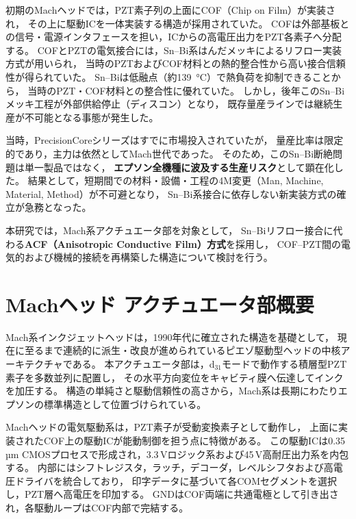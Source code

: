 \documentclass[conference]{IEEEtran}
\begin{document}
初期のMachヘッドでは，PZT素子列の上面にCOF（Chip on Film）が実装され，
その上に駆動ICを一体実装する構造が採用されていた。  
COFは外部基板との信号・電源インタフェースを担い，ICからの高電圧出力をPZT各素子へ分配する。  
COFとPZTの電気接合には，Sn–Bi系はんだメッキによるリフロー実装方式が用いられ，
当時のPZTおよびCOF材料との熱的整合性から高い接合信頼性が得られていた。
Sn–Biは低融点（約\SI{139}{\degreeCelsius}）で熱負荷を抑制できることから，
当時のPZT・COF材料との整合性に優れていた。  
しかし，後年このSn–Biメッキ工程が外部供給停止（ディスコン）となり，
既存量産ラインでは継続生産が不可能となる事態が発生した。  

当時，PrecisionCoreシリーズはすでに市場投入されていたが，
量産比率は限定的であり，主力は依然としてMach世代であった。  
そのため，このSn–Bi断絶問題は単一製品ではなく，
\textbf{エプソン全機種に波及する生産リスク}として顕在化した。  
結果として，短期間での材料・設備・工程の4M変更（Man, Machine, Material, Method）が不可避となり，
Sn–Bi系接合に依存しない新実装方式の確立が急務となった。

本研究では，Mach系アクチュエータ部を対象として，
Sn–Biリフロー接合に代わる\textbf{ACF（Anisotropic Conductive Film）方式}を採用し，
COF–PZT間の電気的および機械的接続を再構築した構造について検討を行う。

\section{Machヘッド アクチュエータ部概要}

Mach系インクジェットヘッドは，1990年代に確立された構造を基礎として，
現在に至るまで連続的に派生・改良が進められているピエゾ駆動型ヘッドの中核アーキテクチャである。  
本アクチュエータ部は，d$_{31}$モードで動作する積層型PZT素子を多数並列に配置し，
その水平方向変位をキャビティ膜へ伝達してインクを加圧する。  
構造の単純さと駆動信頼性の高さから，Mach系は長期にわたりエプソンの標準構造として位置づけられている。

Machヘッドの電気駆動系は，PZT素子が受動変換素子として動作し，
上面に実装されたCOF上の駆動ICが能動制御を担う点に特徴がある。  
この駆動ICは0.35\,µm CMOSプロセスで形成され，3.3\,Vロジック系および45\,V高耐圧出力系を内包する。  
内部にはシフトレジスタ，ラッチ，デコーダ，レベルシフタおよび高電圧ドライバを統合しており，
印字データに基づいて各COMセグメントを選択し，PZT層へ高電圧を印加する。  
GNDはCOF両端に共通電極として引き出され，各駆動ループはCOF内部で完結する。

\end{document}
